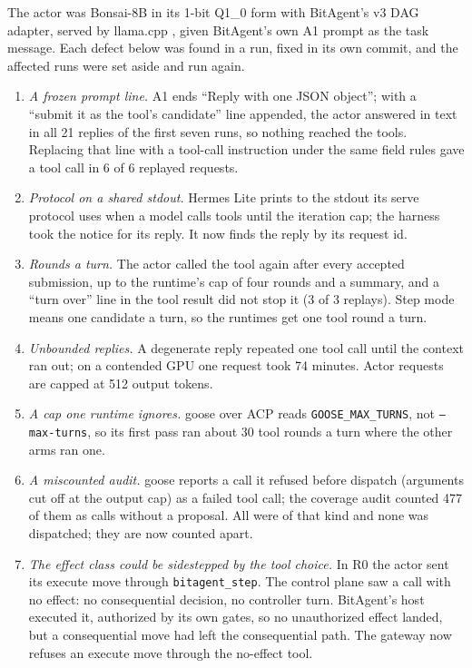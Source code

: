 \documentclass[11pt]{article}
\begin{document}
The actor was Bonsai-8B \citep{prismml2026bonsai} in its 1-bit Q1\_0 form with BitAgent's v3 DAG adapter, served by llama.cpp \citep{llamacpp}, given BitAgent's own A1 prompt as the task message. Each defect below was found in a run, fixed in its own commit, and the affected runs were set aside and run again.

\begin{enumerate}[leftmargin=1.4em,itemsep=2pt]
\item \emph{A frozen prompt line.} A1 ends ``Reply with one JSON object''; with a ``submit it as the tool's candidate'' line appended, the actor answered in text in all 21 replies of the first seven runs, so nothing reached the tools. Replacing that line with a tool-call instruction under the same field rules gave a tool call in 6 of 6 replayed requests.
\item \emph{Protocol on a shared stdout.} Hermes Lite prints to the stdout its serve protocol uses when a model calls tools until the iteration cap; the harness took the notice for its reply. It now finds the reply by its request id.
\item \emph{Rounds a turn.} The actor called the tool again after every accepted submission, up to the runtime's cap of four rounds and a summary, and a ``turn over'' line in the tool result did not stop it (3 of 3 replays). Step mode means one candidate a turn, so the runtimes get one tool round a turn.
\item \emph{Unbounded replies.} A degenerate reply repeated one tool call until the context ran out; on a contended GPU one request took 74 minutes. Actor requests are capped at 512 output tokens.
\item \emph{A cap one runtime ignores.} goose over ACP reads \texttt{GOOSE\_MAX\_TURNS}, not \texttt{--max-turns}, so its first pass ran about 30 tool rounds a turn where the other arms ran one.
\item \emph{A miscounted audit.} goose reports a call it refused before dispatch (arguments cut off at the output cap) as a failed tool call; the coverage audit counted 477 of them as calls without a proposal. All were of that kind and none was dispatched; they are now counted apart.
\item \emph{The effect class could be sidestepped by the tool choice.} In R0 the actor sent its execute move through \texttt{bitagent\_step}. The control plane saw a call with no effect: no consequential decision, no controller turn. BitAgent's host executed it, authorized by its own gates, so no unauthorized effect landed, but a consequential move had left the consequential path. The gateway now refuses an execute move through the no-effect tool.
\end{enumerate}
\end{document}
